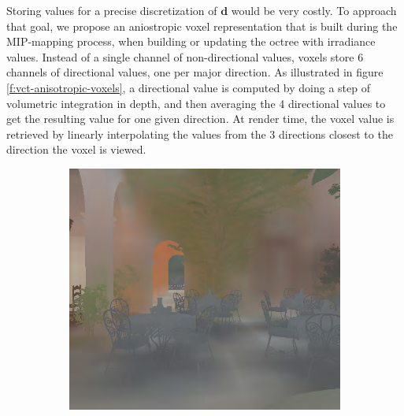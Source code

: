 Storing values for a precise discretization of $\mathbf{d}$ would be very costly. To approach that goal, we propose an aniostropic voxel representation that is built during the MIP-mapping process, when building or updating the octree with irradiance values. Instead of a single channel of non-directional values, voxels store 6 channels of directional values, one per major direction. As illustrated in figure \ref{f:vct-anisotropic-voxels}, a directional value is computed by doing a step of volumetric integration in depth, and then averaging the 4 directional values to get the resulting value for one given direction. At render time, the voxel value is retrieved by linearly interpolating the values from the 3 directions closest to the direction the voxel is viewed. 

\begin{figure}
	\begin{subfigure}[b]{0.5\textwidth}
		\includegraphics[width=1.0\textwidth]{graphics/vct/vct-12-1}
	\end{subfigure}
	\begin{subfigure}[b]{0.5\textwidth}

\end{subfigure}
\end{figure}
